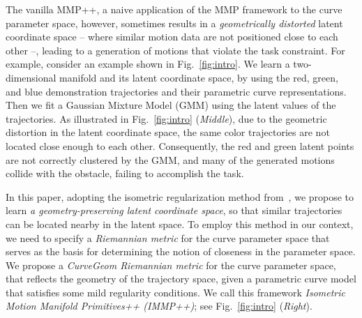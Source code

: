 
The vanilla MMP++, a naive application of the MMP framework to the curve parameter space, however, sometimes results in a {\it geometrically distorted} latent coordinate space -- where similar motion data are not positioned close to each other --, leading to a generation of motions that violate the task constraint. 
For example, consider an example shown in Fig.~\ref{fig:intro}.
We learn a two-dimensional manifold and its latent coordinate space, by using the red, green, and blue demonstration trajectories and their parametric curve representations. 
Then we fit a Gaussian Mixture Model (GMM) using the latent values of the trajectories.
As illustrated in Fig.~\ref{fig:intro} (\textit{Middle}), due to the geometric distortion in the latent coordinate space, the same color trajectories are not located close enough to each other. Consequently, the red and green latent points are not correctly clustered by the GMM, and many of the generated motions collide with the obstacle, failing to accomplish the task.  
  

In this paper, adopting the isometric regularization method from~\cite{yonghyeon2022regularized}, we propose to learn {\it a geometry-preserving latent coordinate space}, so that similar trajectories can be located nearby in the latent space. 
To employ this method in our context, we need to specify a {\it Riemannian metric} for the curve parameter space that serves as the basis for determining the notion of closeness in the parameter space. 
We propose a {\it CurveGeom Riemannian metric} for the curve parameter space, that reflects the geometry of the trajectory space, given a parametric curve model that satisfies some mild regularity conditions.
We call this framework {\it Isometric Motion Manifold Primitives++ (IMMP++)}; see Fig.~\ref{fig:intro} ({\it Right}).

